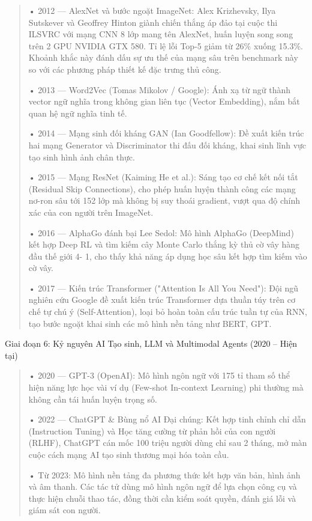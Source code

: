 \begin{quote}
• 2012 --- AlexNet và bước ngoặt ImageNet: Alex Krizhevsky, Ilya
Sutskever và Geoffrey Hinton giành chiến thắng áp đảo tại cuộc thi
ILSVRC với mạng CNN 8 lớp mang tên AlexNet, huấn luyện song song trên 2
GPU NVIDIA GTX 580. Tỉ lệ lỗi Top-5 giảm từ 26\% xuống 15.3\%. Khoảnh
khắc này đánh dấu sự ưu thế của mạng sâu trên benchmark này so với các
phương pháp thiết kế đặc trưng thủ công.

• 2013 --- Word2Vec (Tomas Mikolov / Google): Ánh xạ từ ngữ thành vector
ngữ nghĩa trong không gian liên tục (Vector Embedding), nắm bắt quan hệ
ngữ nghĩa tinh tế.

• 2014 --- Mạng sinh đối kháng GAN (Ian Goodfellow): Đề xuất kiến trúc
hai mạng Generator và Discriminator thi đấu đối kháng, khai sinh lĩnh
vực tạo sinh hình ảnh chân thực.

• 2015 --- Mạng ResNet (Kaiming He et al.): Sáng tạo cơ chế kết nối tắt
(Residual Skip Connections), cho phép huấn luyện thành công các mạng
nơ-ron sâu tới 152 lớp mà không bị suy thoái gradient, vượt qua độ chính
xác của con người trên ImageNet.

• 2016 --- AlphaGo đánh bại Lee Sedol: Mô hình AlphaGo (DeepMind) kết
hợp Deep RL và tìm kiếm cây Monte Carlo thắng kỳ thủ cờ vây hàng đầu thế
giới 4- 1, cho thấy khả năng áp dụng học sâu kết hợp tìm kiếm vào cờ vây.

• 2017 --- Kiến trúc Transformer ("Attention Is All You Need"): Đội ngũ
nghiên cứu Google đề xuất kiến trúc Transformer dựa thuần túy trên cơ
chế tự chú ý (Self-Attention), loại bỏ hoàn toàn cấu trúc tuần tự của
RNN, tạo bước ngoặt khai sinh các mô hình nền tảng như BERT, GPT.
\end{quote}

Giai đoạn 6: Kỷ nguyên AI Tạo sinh, LLM và Multimodal Agents (2020 --
Hiện tại)

\begin{quote}
• 2020 --- GPT-3 (OpenAI): Mô hình ngôn ngữ với 175 tỉ tham số thể hiện
năng lực học vài ví dụ (Few-shot In-context Learning) phi thường mà
không cần tái huấn luyện trọng số.

• 2022 --- ChatGPT \& Bùng nổ AI Đại chúng: Kết hợp tinh chỉnh chỉ dẫn
(Instruction Tuning) và Học tăng cường từ phản hồi của con người (RLHF),
ChatGPT cán mốc 100 triệu người dùng chỉ sau 2 tháng, mở màn cuộc cách
mạng AI tạo sinh thương mại hóa toàn cầu.

• Từ 2023: Mô hình nền tảng đa phương thức kết hợp văn bản, hình ảnh và
âm thanh. Các tác tử dùng mô hình ngôn ngữ để lựa chọn công cụ và thực
hiện chuỗi thao tác, đồng thời cần kiểm soát quyền, đánh giá lỗi và giám
sát con người.
\end{quote}

